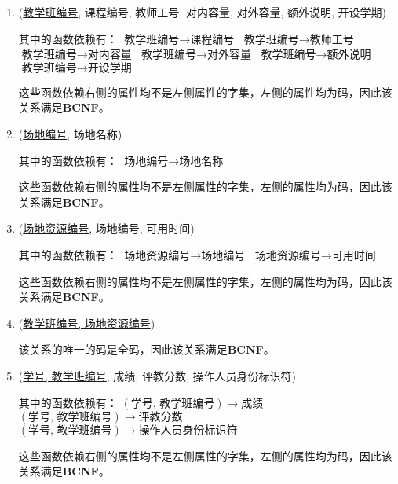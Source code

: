 \begin{enumerate}
    \item (\uline{教学班编号}, 课程编号, 教师工号, 对内容量, 对外容量, 额外说明, 开设学期) \par
    其中的函数依赖有： \newline
    $\text{教学班编号} \rightarrow \text{课程编号}$ \newline
    $\text{教学班编号} \rightarrow \text{教师工号}$ \newline
    $\text{教学班编号} \rightarrow \text{对内容量}$ \newline
    $\text{教学班编号} \rightarrow \text{对外容量}$ \newline
    $\text{教学班编号} \rightarrow \text{额外说明}$ \newline
    $\text{教学班编号} \rightarrow \text{开设学期}$ \par
    这些函数依赖右侧的属性均不是左侧属性的字集，左侧的属性均为码，因此该关系满足\textbf{BCNF}。
    
    \item (\uline{场地编号}, 场地名称) \par
    其中的函数依赖有： \newline
    $\text{场地编号} \rightarrow \text{场地名称}$ \par
    这些函数依赖右侧的属性均不是左侧属性的字集，左侧的属性均为码，因此该关系满足\textbf{BCNF}。
    
    \item (\uline{场地资源编号}, 场地编号, 可用时间) \par
    其中的函数依赖有： \newline
    $\text{场地资源编号} \rightarrow \text{场地编号}$ \newline
    $\text{场地资源编号} \rightarrow \text{可用时间}$ \par
    这些函数依赖右侧的属性均不是左侧属性的字集，左侧的属性均为码，因此该关系满足\textbf{BCNF}。
    
    \item (\uline{教学班编号, 场地资源编号}) \par
    该关系的唯一的码是全码，因此该关系满足\textbf{BCNF}。
    
    \item (\uline{学号, 教学班编号}, 成绩, 评教分数, 操作人员身份标识符) \par
    其中的函数依赖有： \newline
    $(\text{学号, 教学班编号}) \rightarrow \text{成绩}$ \newline
    $(\text{学号, 教学班编号}) \rightarrow \text{评教分数}$ \newline
    $(\text{学号, 教学班编号}) \rightarrow \text{操作人员身份标识符}$ \par
    这些函数依赖右侧的属性均不是左侧属性的字集，左侧的属性均为码，因此该关系满足\textbf{BCNF}。
    

\end{enumerate}
